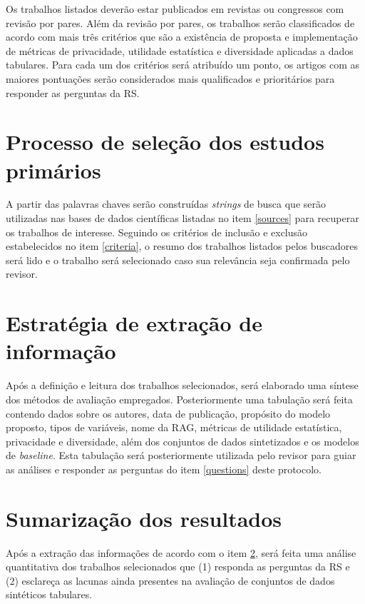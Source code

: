 Os trabalhos listados deverão estar publicados em revistas ou congressos com revisão por pares. Além da revisão por pares, os trabalhos serão classificados de acordo com mais três critérios que são a existência de proposta e implementação de métricas de privacidade, utilidade estatística e diversidade aplicadas a dados tabulares. Para cada um dos critérios será atribuído um ponto, os artigos com as maiores pontuações serão considerados mais qualificados e prioritários para responder as perguntas da RS.

\section{Processo de seleção dos estudos primários}

A partir das palavras chaves serão construídas \textit{strings} de busca que serão utilizadas nas bases de dados científicas listadas no item \ref{sources} para recuperar os trabalhos de interesse. Seguindo os critérios de inclusão e exclusão estabelecidos no item \ref{criteria}, o resumo dos trabalhos listados pelos buscadores será lido e o trabalho será selecionado caso sua relevância seja confirmada pelo revisor.

\section{Estratégia de extração de informação}
\label{extraction}

Após a definição e leitura dos trabalhos selecionados, será elaborado uma síntese dos métodos de avaliação empregados. Posteriormente uma tabulação será feita contendo dados sobre os autores, data de publicação, propósito do modelo proposto, tipos de variáveis, nome da RAG, métricas de utilidade estatística, privacidade e diversidade, além dos conjuntos de dados sintetizados e os modelos de \textit{baseline}. Esta tabulação será posteriormente utilizada pelo revisor para guiar as análises e responder as perguntas do item \ref{questions} deste protocolo.

\section{Sumarização dos resultados}

Após a extração das informações de acordo com o item \ref{extraction}, será feita uma análise quantitativa dos trabalhos selecionados que (1) responda as perguntas da RS e (2) esclareça as lacunas ainda presentes na avaliação de conjuntos de dados sintéticos tabulares.

